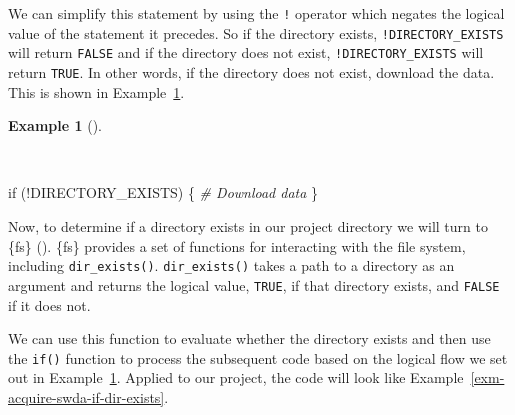 \documentclass[
  letterpaper,
  krantz1]{latex/krantz-mod}
\newenvironment{Shaded}{\begin{snugshade}}{\end{snugshade}}
\newcommand{\CommentTok}[1]{\textcolor[rgb]{0.00,0.00,0.00}{\textit{#1}}}
\newcommand{\ControlFlowTok}[1]{\textcolor[rgb]{0.00,0.00,0.00}{#1}}
\newcommand{\NormalTok}[1]{\textcolor[rgb]{0.00,0.00,0.00}{#1}}
\newcommand{\SpecialCharTok}[1]{\textcolor[rgb]{0.00,0.00,0.00}{#1}}
\theoremstyle{definition}
\newtheorem{example}{Example}[chapter]
\theoremstyle{definition}
\theoremstyle{remark}
\begin{document}
We can simplify this statement by using the \texttt{!} operator which
negates the logical value of the statement it precedes. So if the
directory exists, \texttt{!DIRECTORY\_EXISTS} will return \texttt{FALSE}
and if the directory does not exist, \texttt{!DIRECTORY\_EXISTS} will
return \texttt{TRUE}. In other words, if the directory does not exist,
download the data. This is shown in
Example~\ref{exm-acquire-if-dir-exists-simplified}.

\begin{example}[]\protect\hypertarget{exm-acquire-if-dir-exists-simplified}{}\label{exm-acquire-if-dir-exists-simplified}

~

\begin{Shaded}
\begin{Highlighting}[numbers=left,,]
\ControlFlowTok{if}\NormalTok{ (}\SpecialCharTok{!}\NormalTok{DIRECTORY\_EXISTS) \{}
  \CommentTok{\# Download data}
\NormalTok{\}}
\end{Highlighting}
\end{Shaded}

\end{example}

Now, to determine if a directory exists in our project directory we will
turn to \{fs\} ().
\{fs\} provides a set of functions for interacting with the file system,
including \texttt{dir\_exists()}. \texttt{dir\_exists()} takes a path to
a directory as an argument and returns the logical value, \texttt{TRUE},
if that directory exists, and \texttt{FALSE} if it does not.

We can use this function to evaluate whether the directory exists and
then use the \texttt{if()} function to process the subsequent code based
on the logical flow we set out in
Example~\ref{exm-acquire-if-dir-exists-simplified}. Applied to our
project, the code will look like
Example~\ref{exm-acquire-swda-if-dir-exists}.
\end{document}
